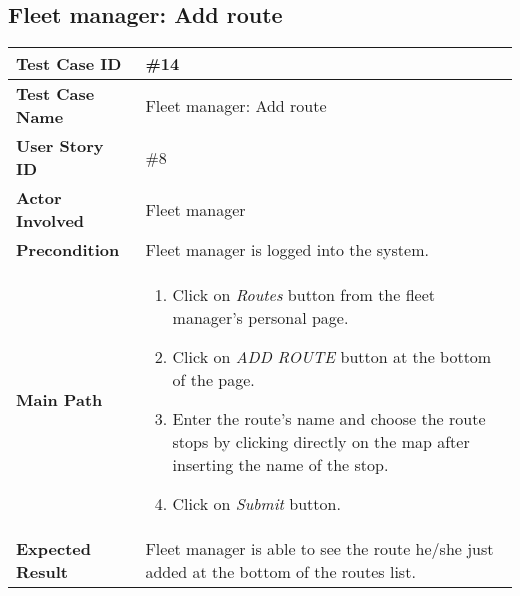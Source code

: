 \subsection{Fleet manager: Add route}
\begin{center}
	\begin{tabular} { | m{3.5cm} | m{9.5cm} | }
		\hline
		\textbf{Test Case ID} & \#14\\
		\hline
		\textbf{Test Case Name} & Fleet manager: Add route\\
		\hline
		\textbf{User Story ID} & \#8 \\
		\hline
		\textbf{Actor Involved} & Fleet manager\\
		\hline
		\textbf{Precondition} & Fleet manager is logged into the system.\\
		\hline
		\textbf{Main Path} & 
		\begin{enumerate}
			\item Click on \textit{Routes} button from the fleet manager's personal page.
			\item Click on \textit{ADD ROUTE} button at the bottom of the page.
			\item Enter the route's name and choose the route stops by clicking directly on the map after inserting the name of the stop.
			\item Click on \textit{Submit} button.
		\end{enumerate}\\
		\hline
		\textbf{Expected Result} & Fleet manager is able to see the route he/she just added at the bottom of the routes list.\\
		\hline
	\end{tabular}
\end{center}
\newpage
